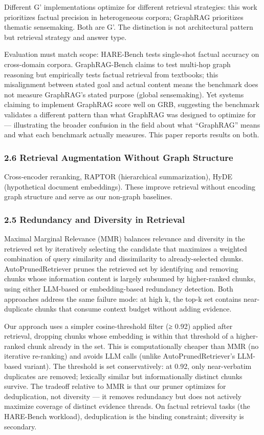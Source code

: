 Different G' implementations optimize for different retrieval strategies: this work prioritizes factual precision in heterogeneous corpora; GraphRAG prioritizes thematic sensemaking. Both are G'. The distinction is not architectural pattern but retrieval strategy and answer type.

Evaluation must match scope: HARE-Bench tests single-shot factual accuracy on cross-domain corpora. GraphRAG-Bench claims to test multi-hop graph reasoning but empirically tests factual retrieval from textbooks; this misalignment between stated goal and actual content means the benchmark does not measure GraphRAG's stated purpose (global sensemaking). Yet systems claiming to implement GraphRAG score well on GRB, suggesting the benchmark validates a different pattern than what GraphRAG was designed to optimize for --- illustrating the broader confusion in the field about what ``GraphRAG'' means and what each benchmark actually measures. This paper reports results on both.

\subsubsection{2.6 Retrieval Augmentation Without Graph Structure}\label{retrieval-augmentation-without-graph-structure}

Cross-encoder reranking, RAPTOR (hierarchical summarization), HyDE (hypothetical document embeddings). These improve retrieval without encoding graph structure and serve as our non-graph baselines.

\subsubsection{2.5 Redundancy and Diversity in Retrieval}\label{redundancy-and-diversity-in-retrieval}

Maximal Marginal Relevance (MMR) balances relevance and diversity in the retrieved set by iteratively selecting the candidate that maximizes a weighted combination of query similarity and dissimilarity to already-selected chunks. AutoPrunedRetriever prunes the retrieved set by identifying and removing chunks whose information content is largely subsumed by higher-ranked chunks, using either LLM-based or embedding-based redundancy detection. Both approaches address the same failure mode: at high k, the top-k set contains near-duplicate chunks that consume context budget without adding evidence.

Our approach uses a simpler cosine-threshold filter (≥ 0.92) applied after retrieval, dropping chunks whose embedding is within that threshold of a higher-ranked chunk already in the set. This is computationally cheaper than MMR (no iterative re-ranking) and avoids LLM calls (unlike AutoPrunedRetriever's LLM-based variant). The threshold is set conservatively: at 0.92, only near-verbatim duplicates are removed; lexically similar but informationally distinct chunks survive. The tradeoff relative to MMR is that our pruner optimizes for deduplication, not diversity --- it removes redundancy but does not actively maximize coverage of distinct evidence threads. On factual retrieval tasks (the HARE-Bench workload), deduplication is the binding constraint; diversity is secondary.

